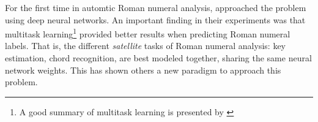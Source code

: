 

For the first time in automtic Roman numeral analysis,
\textcite{chen2018functional} approached the problem using
deep neural networks. An important finding in their
experiments was that multitask learning\footnote{A good
summary of multitask learning is presented by
\textcite{ruder2017overview}} provided better results when
predicting Roman numeral labels. That is, the different
\emph{satellite} tasks of Roman numeral analysis: key
estimation, chord recognition, are best modeled together,
sharing the same neural network weights. This has shown
others a new paradigm to approach this problem.
